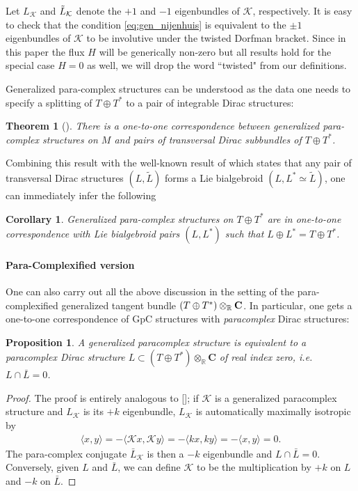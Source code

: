 \documentclass[letterpaper,12pt]{article}
\newcommand{\TT}{{T\oplus T^*}}
\newcommand{\KK}{\mathcal{K}}
\newcommand{\RR}{\mathbb{R}}
\newcommand{\Lt}{{\tl{L}}}
\def\tl{\tilde}
\newtheorem{proposition}[theorem]{Proposition}
\newtheorem{corollary}[theorem]{Corollary}
\newtheorem*{theorem*}{Theorem}
\theoremstyle{definition}
\theoremstyle{remark}
\theoremstyle{examples}
\begin{document}
Let $L_\KK$ and $\Tilde{L}_{\KK}$ denote the $+1$ and $-1$ eigenbundles of $\KK$, respectively. 
It is easy to check that the condition \eqref{eq:gen_nijenhuis} is equivalent to the $\pm 1$ eigenbundles of $\KK$ to be involutive under the twisted Dorfman bracket. Since in this paper the flux $H$ will be generically non-zero but all results hold for the special case $H=0$ as well, we will drop the word ``twisted" from our definitions.

Generalized para-complex structures can be understood as the data one needs to specify a splitting of $\TT$ to a pair of integrable Dirac structures:

\begin{theorem*}[\cite{wade2004dirac}]\label{thm:pairofdirac}
There is a one-to-one correspondence between generalized para-complex structures on $M$ and pairs of transversal Dirac subbundles of $\TT$.
\end{theorem*}

Combining this result with the well-known result of \cite{Liu:1995lsa} which states that any pair of transversal Dirac structures $(L,\Lt)$ forms a Lie bialgebroid $(L,L^*\simeq \Lt)$, one can immediately infer the following

\begin{corollary}
Generalized para-complex structures on $\TT$ are in one-to-one correspondence with Lie bialgebroid pairs $(L,L^*)$ such that $L\oplus L^*=\TT$. 
\end{corollary}

\paragraph{Para-Complexified version}
One can also carry out all the above discussion in the setting of the para-complexified generalized tangent bundle $(\TT)\otimes_\RR \Cp$. In particular, one gets a one-to-one correspondence of GpC structures with {\it paracomplex} Dirac structures:
\begin{proposition}\label{prop: pcomplexified}
A generalized paracomplex structure is equivalent to a paracomplex Dirac structure $L \subset (\TT)\otimes_\mathbb{R} \mathbf{C}$ of real index zero, i.e. $L \cap \bar{L}=0$.
\end{proposition}
\begin{proof}
The proof is entirely analogous to []; if $\KK$ is a generalized paracomplex structure and $L_\KK$ is its $+k$ eigenbundle, $L_\KK$ is automatically maximally isotropic by 
\begin{align*}
\langle x,y \rangle = -\langle\KK x,\KK y \rangle = -\langle k x,k y \rangle = -\langle x,y\rangle=0.
\end{align*}
The para-complex conjugate $\bar{L}_\KK$ is then a $-k$ eigenbundle and $L\cap\bar{L}=0$. Conversely, given $L$ and $\bar{L}$, we can define $\KK$ to be the multiplication by $+k$ on $L$ and $-k$ on $\bar{L}$.
\end{proof}
\end{document}
